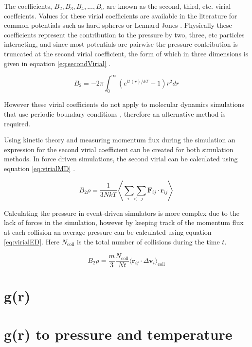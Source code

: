 \documentclass[12pt]{UoAthesis}
\begin{document}
The coefficients, $B_2, B_3, B_4, ..., B_n$ are known as the second,
third, etc. virial coeffcients.  Values for these virial coefficients
are available in the literature for common potentials such as hard
spheres \cite{Labik2005} or Lennard-Jones
\cite{Schultz2009}. Physically these coefficients represent the
contribution to the pressure by two, three, etc particles interacting,
and since most potentials are pairwise the pressure contribution is
truncated at the second virial coefficient, the form of which in three
dimensions is given in equation \eqref{eq:secondVirial} \cite{Smith2005}.

\begin{equation}
  \label{eq:secondVirial}
  B_2 = -2\pi \int^\infty_0 \left(e^{\mathcal{U}(r)/kT}-1\right)r^2dr
\end{equation}

However these virial coefficients do not apply to molecular dynamics
simulations that use periodic boundary conditions \cite{Haile1997},
therefore an alternative method is required.

Using kinetic theory and measuring momentum flux during the simulation
an expression for the second virial coefficient can be created for
both simulation methods.  In force driven simulations, the second
virial can be calculated using equation \eqref{eq:virialMD}
\cite{Haile1997}.

\begin{equation}
  \label{eq:virialMD}
  B_2\rho = \frac{1}{3NkT}\left \langle\underset{i\;\;<\;\;j}{\sum\sum}\mathbf{F}_{ij}\cdot\mathbf{r}_{ij} \right\rangle
\end{equation}

Calculating the pressure in event-driven simulators is more complex
due to the lack of forces in the simulation, however by keeping track
of the momentum flux at each collision an average pressure can be
calculated using equation \eqref{eq:virialED}\cite{Lue2005}.  Here $N_{\text{coll}}$
is the total number of collisions during the time $t$.

\begin{equation}
  \label{eq:virialED}
  B_2\rho = \frac{m}{3}\frac{N_{\text{coll}}}{Nt}\langle\mathbf{r}_{ij}\cdot\Delta \mathbf{v}_i\rangle_{\text{coll}}
\end{equation}
\section{g(r)}
\section{g(r) to pressure and temperature}
\end{document}
